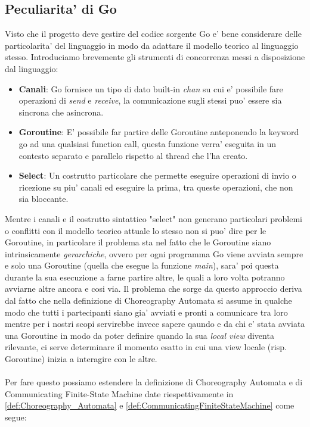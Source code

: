 \subsection{Peculiarita' di Go}
Visto che il progetto deve gestire del codice sorgente Go e' bene considerare delle particolarita' del linguaggio in modo da adattare il modello teorico al linguaggio stesso. Introduciamo brevemente gli strumenti di concorrenza messi a disposizione dal linguaggio:
\begin{itemize}
    \item \textbf{Canali}: Go fornisce un tipo di dato built-in \emph{chan} su cui e' possibile fare operazioni di \emph{send} e \emph{receive}, la comunicazione sugli stessi puo' essere sia sincrona che asincrona.
    \item \textbf{Goroutine}: E' possibile far partire delle Goroutine anteponendo la keyword go ad una qualsiasi function call, questa funzione verra' eseguita in un contesto separato e parallelo rispetto al thread che l'ha creato.
    \item \textbf{Select}: Un costrutto particolare che permette eseguire operazioni di invio o ricezione su piu' canali ed eseguire la prima, tra queste operazioni, che non sia bloccante.
\end{itemize}
Mentre i canali e il costrutto sintattico "select" non generano particolari problemi o conflitti con il modello teorico attuale lo stesso non si puo' dire per le Goroutine, in particolare il problema sta nel fatto che le Goroutine siano intrinsicamente \emph{gerarchiche}, ovvero per ogni programma Go viene avviata sempre e solo una Goroutine (quella che esegue la funzione \emph{main}), sara' poi questa durante la sua esecuzione a farne partire altre, le quali a loro volta potranno avviarne altre ancora e cosi via.
Il problema che sorge da questo approccio deriva dal fatto che nella definizione di Choreography Automata si assume in qualche modo che tutti i partecipanti siano gia' avviati e pronti a comunicare tra loro mentre per i nostri scopi servirebbe invece sapere qaundo e da chi e' stata avviata una Goroutine in modo da poter definire quando la sua \emph{local view} diventa rilevante, ci serve determinare il momento esatto in cui una view locale (risp. Goroutine) inizia a interagire con le altre.\\ \\
Per fare questo possiamo estendere la definizione di Choreography Automata e di Communicating Finite-State Machine date riespettivamente in \ref{def:Choreography_Automata} e \ref{def:CommunicatingFiniteStateMachine} come segue:

